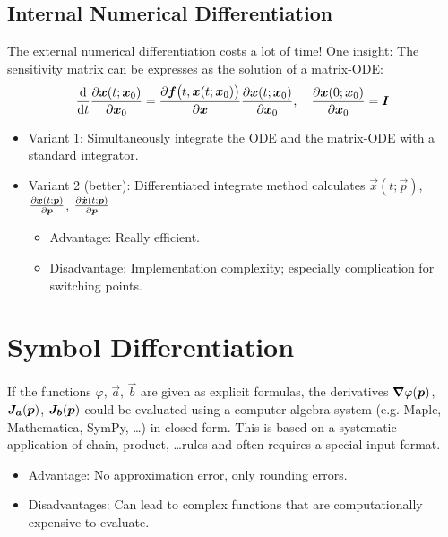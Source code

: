 		\subsection{Internal Numerical Differentiation}
			The external numerical differentiation costs a lot of time! One insight: The sensitivity matrix can be expresses as the solution of a matrix-ODE:
			\begin{align*}
				\dv{t} \pdv{\bm{x}(t; \bm{x}_0)}{\bm{x}_0} = \pdv{\bm{f}\big(t, \bm{x}(t; \bm{x}_0)\big)}{\bm{x}} \pdv{\bm{x}(t; \bm{x}_0)}{\bm{x}_0},\quad \pdv{\bm{x}(0; \bm{x}_0)}{\bm{x}_0} = \bm{I}
			\end{align*}

			\begin{itemize}
				\item Variant 1: Simultaneously integrate the ODE and the matrix-ODE with a standard integrator.
				\item Variant 2 (better): Differentiated integrate method calculates \( \vec{x}(t; \vec{p}) \), \( \pdv{\bm{x}(t; \bm{p})}{\bm{p}} \), \( \pdv{\dot{\bm{x}}(t; \bm{p})}{\bm{p}} \)
					\begin{itemize}
						\item Advantage: Really efficient.
						\item Disadvantage: Implementation complexity; especially complication for switching points.
					\end{itemize}
			\end{itemize}

	\section{Symbol Differentiation}
		If the functions \( \varphi \), \( \vec{a} \), \( \vec{b} \) are given as explicit formulas, the derivatives \( \grad{\varphi}(\bm{p}) \), \( \bm{J}_{\bm{a}}(\bm{p}) \), \( \bm{J}_{\bm{b}}(\bm{p}) \) could be evaluated using a computer algebra system (e.g. Maple, Mathematica, SymPy, \dots) in closed form. This is based on a systematic application of chain, product, \dots rules and often requires a special input format.
		\begin{itemize}
			\item Advantage: No approximation error, only rounding errors.
			\item Disadvantages: Can lead to complex functions that are computationally expensive to evaluate.
		\end{itemize}

